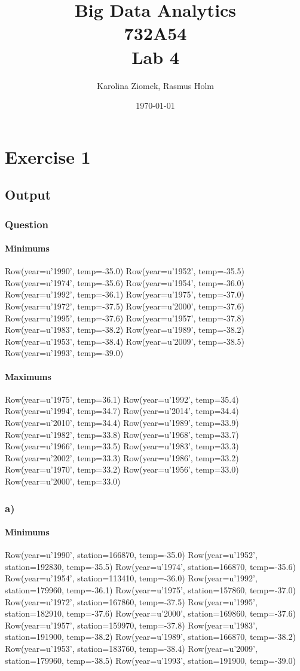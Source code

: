 \documentclass[10pt]{article}
\author{Karolina Ziomek, Rasmus Holm}
\date{\today}
\title{Big Data Analytics \\ 732A54 \\ Lab 4}
\begin{document}
\maketitle
\newpage

\section*{Exercise 1}
\label{sec-1}
\subsection*{Output}
\label{sec-1-1}
\subsubsection*{Question}
\label{sec-1-1-1}
\paragraph*{Minimums}
\label{sec-1-1-1-1}
Row(year=u'1990', temp=-35.0)
Row(year=u'1952', temp=-35.5)
Row(year=u'1974', temp=-35.6)
Row(year=u'1954', temp=-36.0)
Row(year=u'1992', temp=-36.1)
Row(year=u'1975', temp=-37.0)
Row(year=u'1972', temp=-37.5)
Row(year=u'2000', temp=-37.6)
Row(year=u'1995', temp=-37.6)
Row(year=u'1957', temp=-37.8)
Row(year=u'1983', temp=-38.2)
Row(year=u'1989', temp=-38.2)
Row(year=u'1953', temp=-38.4)
Row(year=u'2009', temp=-38.5)
Row(year=u'1993', temp=-39.0)
\paragraph*{Maximums}
\label{sec-1-1-1-2}
Row(year=u'1975', temp=36.1)
Row(year=u'1992', temp=35.4)
Row(year=u'1994', temp=34.7)
Row(year=u'2014', temp=34.4)
Row(year=u'2010', temp=34.4)
Row(year=u'1989', temp=33.9)
Row(year=u'1982', temp=33.8)
Row(year=u'1968', temp=33.7)
Row(year=u'1966', temp=33.5)
Row(year=u'1983', temp=33.3)
Row(year=u'2002', temp=33.3)
Row(year=u'1986', temp=33.2)
Row(year=u'1970', temp=33.2)
Row(year=u'1956', temp=33.0)
Row(year=u'2000', temp=33.0)
\subsubsection*{a)}
\label{sec-1-1-2}
\paragraph*{Minimums}
\label{sec-1-1-2-1}
Row(year=u'1990', station=166870, temp=-35.0)
Row(year=u'1952', station=192830, temp=-35.5)
Row(year=u'1974', station=166870, temp=-35.6)
Row(year=u'1954', station=113410, temp=-36.0)
Row(year=u'1992', station=179960, temp=-36.1)
Row(year=u'1975', station=157860, temp=-37.0)
Row(year=u'1972', station=167860, temp=-37.5)
Row(year=u'1995', station=182910, temp=-37.6)
Row(year=u'2000', station=169860, temp=-37.6)
Row(year=u'1957', station=159970, temp=-37.8)
Row(year=u'1983', station=191900, temp=-38.2)
Row(year=u'1989', station=166870, temp=-38.2)
Row(year=u'1953', station=183760, temp=-38.4)
Row(year=u'2009', station=179960, temp=-38.5)
Row(year=u'1993', station=191900, temp=-39.0)
\end{document}
